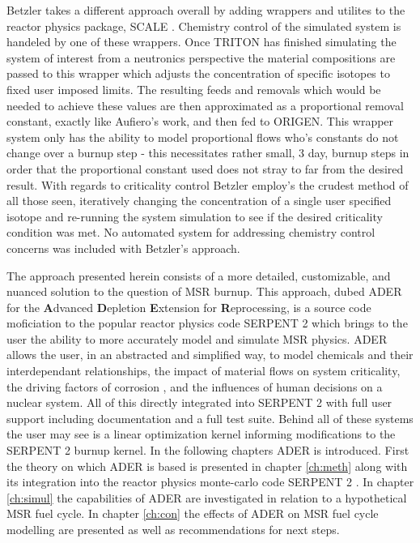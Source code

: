 Betzler takes a different approach overall by adding wrappers and utilites
to the reactor physics package, SCALE \cite{Betlzer}. 
Chemistry control of the simulated
system is handeled by one of these wrappers. Once TRITON has finished simulating
the system of interest from a neutronics perspective the material compositions
are passed to this wrapper which adjusts the concentration of specific isotopes
to fixed user imposed limits. The resulting feeds and removals which would be
needed to achieve these values are then approximated as a proportional removal
constant, exactly like Aufiero's work, and then fed to ORIGEN. This wrapper
system only has the ability to model proportional flows who's constants do not
change over a burnup step - this necessitates rather small, 3 day, burnup steps
in order that the proportional constant used does not stray to far from the
desired result. With regards to criticality control Betzler employ's the crudest
method of all those seen, iteratively changing the concentration of a single
user specified isotope and re-running the system simulation to see if the
desired criticality condition was met. No automated system for addressing
chemistry control concerns was included with Betzler's approach. 

The approach presented herein consists of a more detailed, customizable, and
nuanced solution to the question of MSR burnup. This approach, dubed ADER for
the \textbf{A}dvanced \textbf{D}epletion \textbf{E}xtension for 
\textbf{R}eprocessing, is a source code moficiation to the popular reactor
physics code SERPENT 2 which brings to the user the ability to more accurately
model and simulate MSR physics. ADER allows the user, in an abstracted and
simplified way, to model chemicals and their interdependant relationships, the
impact of material flows on system criticality, the driving factors of corrosion
, and the influences of human decisions on a nuclear system. All of this
directly integrated into SERPENT 2 with full user support including
documentation and a full test suite. Behind all of these systems the user may
see is a linear optimization kernel informing modifications to the SERPENT 2
burnup kernel.  In the following chapters ADER is introduced. First the theory 
on which ADER is based is
presented in chapter \ref{ch:meth} along with its integration into the reactor
physics monte-carlo code SERPENT 2 \cite{Jaakko}. In chapter
\ref{ch:simul} the capabilities of ADER are investigated in relation to a
hypothetical MSR fuel cycle. In chapter \ref{ch:con} the effects of ADER on
MSR fuel cycle modelling are presented as well as recommendations for next
steps. 
